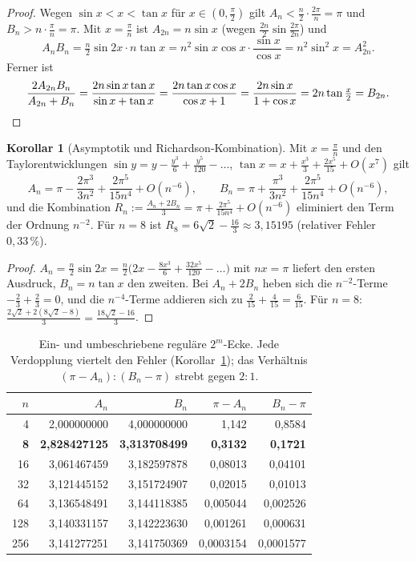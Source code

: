 \documentclass[a4paper,12pt,twoside]{report}
\theoremstyle{definition}
\newtheorem{korollar}{Korollar}
\begin{document}
\begin{proof}
Wegen $\sin x<x<\tan x$ für $x\in(0,\frac\pi2)$ gilt $A_n<\frac n2\cdot\frac{2\pi}n=\pi$ und $B_n>n\cdot\frac\pi n=\pi$. Mit $x=\frac\pi n$ ist $A_{2n}=n\sin x$ (wegen $\frac{2n}2\sin\frac{2\pi}{2n}$) und
\[
A_nB_n=\tfrac n2\sin2x\cdot n\tan x=n^2\sin x\cos x\cdot\frac{\sin x}{\cos x}=n^2\sin^2x=A_{2n}^2 .
\]
Ferner ist
\[
\frac{2A_{2n}B_n}{A_{2n}+B_n}=\frac{2n\sin x\tan x}{\sin x+\tan x}=\frac{2n\tan x\cos x}{\cos x+1}=\frac{2n\sin x}{1+\cos x}=2n\tan\tfrac x2=B_{2n}.\qedhere
\]
\end{proof}

\begin{korollar}[Asymptotik und Richardson-Kombination]\label{ok:kor:rich}
Mit $x=\frac\pi n$ und den Taylorentwicklungen $\sin y=y-\frac{y^3}6+\frac{y^5}{120}-\dots$, $\tan x=x+\frac{x^3}3+\frac{2x^5}{15}+O(x^7)$ gilt
\[
A_n=\pi-\frac{2\pi^3}{3n^2}+\frac{2\pi^5}{15n^4}+O(n^{-6}),\qquad
B_n=\pi+\frac{\pi^3}{3n^2}+\frac{2\pi^5}{15n^4}+O(n^{-6}),
\]
und die Kombination $R_n:=\frac{A_n+2B_n}3=\pi+\frac{2\pi^5}{15n^4}+O(n^{-6})$ eliminiert den Term der Ordnung $n^{-2}$. Für $n=8$ ist $R_8=6\sqrt2-\frac{16}3\approx3{,}15195$ (relativer Fehler $0{,}33\,\%$).
\end{korollar}

\begin{proof}
$A_n=\frac n2\sin2x=\frac n2\bigl(2x-\frac{8x^3}6+\frac{32x^5}{120}-\dots\bigr)$ mit $nx=\pi$ liefert den ersten Ausdruck, $B_n=n\tan x$ den zweiten. Bei $A_n+2B_n$ heben sich die $n^{-2}$-Terme $-\frac23+\frac23=0$, und die $n^{-4}$-Terme addieren sich zu $\frac2{15}+\frac4{15}=\frac6{15}$. Für $n=8$: $\frac{2\sqrt2+2(8\sqrt2-8)}3=\frac{18\sqrt2-16}3$.
\end{proof}

\begin{table}[htbp]
\centering
\small
\begin{tabular}{r r r r r}
$n$ & $A_n$ & $B_n$ & $\pi-A_n$ & $B_n-\pi$\\\hline
4 & 2{,}000000000 & 4{,}000000000 & 1{,}142 & 0{,}8584\\
\textbf{8} & \textbf{2{,}828427125} & \textbf{3{,}313708499} & \textbf{0{,}3132} & \textbf{0{,}1721}\\
16 & 3{,}061467459 & 3{,}182597878 & 0{,}08013 & 0{,}04101\\
32 & 3{,}121445152 & 3{,}151724907 & 0{,}02015 & 0{,}01013\\
64 & 3{,}136548491 & 3{,}144118385 & 0{,}005044 & 0{,}002526\\
128 & 3{,}140331157 & 3{,}142223630 & 0{,}001261 & 0{,}000631\\
256 & 3{,}141277251 & 3{,}141750369 & 0{,}0003154 & 0{,}0001577
\end{tabular}
\caption{Ein- und umbeschriebene reguläre $2^m$-Ecke. Jede Verdopplung viertelt den Fehler (Korollar~\ref{ok:kor:rich}); das Verhältnis $(\pi-A_n):(B_n-\pi)$ strebt gegen $2:1$.}
\label{ok:tab:einschl}
\end{table}
\end{document}
